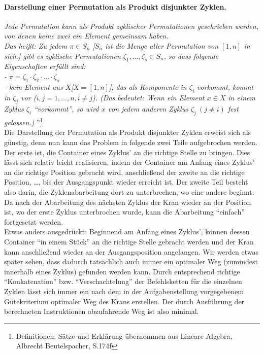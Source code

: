 \paragraph{Darstellung einer Permutation als Produkt disjunkter Zyklen.}
\emph{Jede Permutation kann als Produkt zyklischer Permutationen geschrieben werden, von denen keine zwei ein Element gemeinsam haben.}\\
\emph{Das heißt: Zu jedem $\pi \in S_n$ [$S_n$ ist die Menge aller Permutation von $[1,n]$ in sich.] gibt es zyklische Permutationen $\zeta_1,\dots,\zeta_s \in S_n$,
so dass folgende Eigenschaften erfüllt sind: \\
 - $\pi=\zeta_1\cdot \zeta_2 \cdot \ldots \cdot \zeta_s$ \\
 - kein Element aus $X$[$X=[1,n]$], das als Komponente in $\zeta_i$ vorkommt, kommt in $\zeta_j$ vor ($i,j=1, \dots,n, i \neq j$).
(Das bedeutet: Wenn ein Element $x \in X$ in einem Zyklus $\zeta_i$ ``vorkommt'',
 so wird $x$ von jedem anderen Zyklus $\zeta_j \: (j \neq i)$ fest gelassen.)
}''\footnote{Definitionen, Sätze und Erklärung übernommen aus Lineare Algebra, Albrecht Beutelspacher, S.174f}\\

Die Darstellung der Permutation als Produkt disjunkter Zyklen erweist sich als günstig,
denn nun kann das Problem in folgende zwei Teile aufgebrochen werden.
Der erste ist, die Container eines Zyklus' an die richtige Stelle zu bringen.
Dies lässt sich relativ leicht realisieren, indem der Container am Anfang eines Zyklus' an die richtige Position gebracht wird,
anschließend der zweite an die richtige Position, \dots, bis der Ausgangspunkt wieder erreicht ist.
Der zweite Teil besteht also darin, die Zyklenabarbeitung dort zu unterbrechen, wo eine andere beginnt.
Da nach der Abarbeitung des nächsten Zyklus der Kran wieder an der Position ist,
wo der erste Zyklus unterbrochen wurde, kann die Abarbeitung ``einfach'' fortgesetzt werden. \\
Etwas anders ausgedrückt:
Beginnend am Anfang eines Zyklus', können dessen Container ``in einem Stück'' an die richtige Stelle gebracht werden
 und der Kran kann anschließend wieder an der Ausgangsposition angelangen.
Wir werden etwas später sehen, dass dadurch tatsächlich auch immer ein optimaler Weg (zumindest innerhalb eines Zyklus) gefunden werden kann.
Durch entsprechend richtige ``Konkatenation'' bzw. ``Verschachtelung'' der Befehlsketten für die einzelnen Zyklen lässt sich immer
 ein nach dem in der Aufgabenstellung vorgegebenem Gütekriterium optimaler Weg des Krans erstellen.
Der durch Ausführung der berechneten Instruktionen abzufahrende Weg ist also minimal. \\

